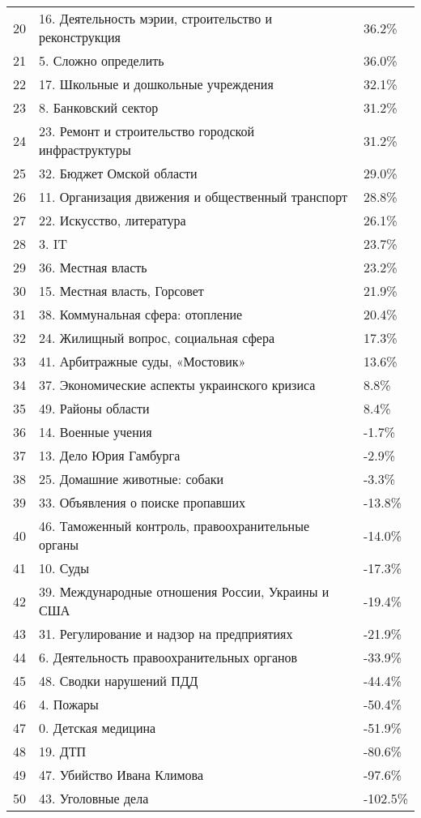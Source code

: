 \begin{longtable}[c]{| L{3cm} | C{7cm} | R{5cm} |}
		20 & 16. Деятельность мэрии, строительство и реконструкция & 36.2\% \\
		21 & 5. Сложно определить & 36.0\% \\
		22 & 17. Школьные и дошкольные учреждения & 32.1\% \\
		23 & 8. Банковский сектор & 31.2\% \\
		24 & 23. Ремонт и строительство городской инфраструктуры & 31.2\% \\
		25 & 32. Бюджет Омской области & 29.0\% \\
		26 & 11. Организация движения и общественный транспорт & 28.8\% \\
		27 & 22. Искусство, литература & 26.1\% \\
		28 & 3. IT & 23.7\% \\
		29 & 36. Местная власть & 23.2\% \\
		30 & 15. Местная власть, Горсовет & 21.9\% \\
		31 & 38. Коммунальная сфера: отопление & 20.4\% \\
		32 & 24. Жилищный вопрос, социальная сфера & 17.3\% \\
		33 & 41. Арбитражные суды, «Мостовик» & 13.6\% \\
		34 & 37. Экономические аспекты украинского кризиса & 8.8\% \\
		35 & 49. Районы области & 8.4\% \\
		36 & 14. Военные учения & -1.7\% \\
		37 & 13. Дело Юрия Гамбурга & -2.9\% \\
		38 & 25. Домашние животные: собаки & -3.3\% \\
		39 & 33. Объявления о поиске пропавших & -13.8\% \\
		40 & 46. Таможенный контроль, правоохранительные органы & -14.0\% \\
		41 & 10. Суды & -17.3\% \\
		42 & 39. Международные отношения России, Украины и США & -19.4\% \\
		43 & 31. Регулирование и надзор на предприятиях & -21.9\% \\
		44 & 6. Деятельность правоохранительных органов & -33.9\% \\
		45 & 48. Сводки нарушений ПДД & -44.4\% \\
		46 & 4. Пожары & -50.4\% \\
		47 & 0. Детская медицина & -51.9\% \\
		48 & 19. ДТП & -80.6\% \\
		49 & 47. Убийство Ивана Климова & -97.6\% \\
		50 & 43. Уголовные дела & -102.5\% \\
	\hline
\end{longtable}


